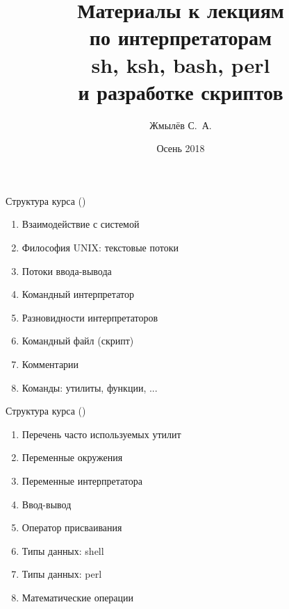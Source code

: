 \documentclass{beamer}
\title{\LARGE Материалы к лекциям \\ по интерпретаторам \\
   sh, ksh, bash, perl \\ и разработке скриптов}
\author{Жмылёв С.~А.}
\date{Осень 2018}
\begin{document}
 \Large

\begin{frame} \titlepage \end{frame}

\begin{frame}[fragile]{Структура курса ()}
\begin{enumerate}

\item Взаимодействие с системой
\item Философия UNIX: текстовые потоки
\item Потоки ввода-вывода
\item Командный интерпретатор
\item Разновидности интерпретаторов
\item Командный файл (скрипт)
\item Комментарии
\item Команды: утилиты, функции, ...

\setcounter{TocEnum}{\value{enumi}}
\end{enumerate}
\end{frame}

\begin{frame}[fragile]{Структура курса ()}
\begin{enumerate} \setcounter{enumi}{\value{TocEnum}}

\item Перечень часто используемых утилит
\item Переменные окружения
\item Переменные интерпретатора
\item Ввод-вывод
\item Оператор присваивания
\item Типы данных: shell
\item Типы данных: perl
\item Математические операции

\setcounter{TocEnum}{\value{enumi}}
\end{enumerate}
\end{frame}
\end{document}
